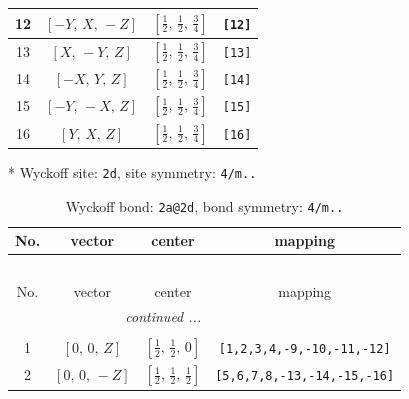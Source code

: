 \documentclass[fleqn,8pt]{jsarticle}
\begin{document}
\begin{longtable}{cccc}
12 & $\left[ - Y,\, X,\, - Z \right]$ & $\left[ \frac{1}{2},\, \frac{1}{2},\, \frac{3}{4} \right]$ & {\tt [12]} \\ \hline
13 & $\left[ X,\, - Y,\, Z \right]$ & $\left[ \frac{1}{2},\, \frac{1}{2},\, \frac{3}{4} \right]$ & {\tt [13]} \\ \hline
14 & $\left[ - X,\, Y,\, Z \right]$ & $\left[ \frac{1}{2},\, \frac{1}{2},\, \frac{3}{4} \right]$ & {\tt [14]} \\ \hline
15 & $\left[ - Y,\, - X,\, Z \right]$ & $\left[ \frac{1}{2},\, \frac{1}{2},\, \frac{3}{4} \right]$ & {\tt [15]} \\ \hline
16 & $\left[ Y,\, X,\, Z \right]$ & $\left[ \frac{1}{2},\, \frac{1}{2},\, \frac{3}{4} \right]$ & {\tt [16]} \\
\end{longtable}
* Wyckoff site: {\tt 2d}, site symmetry: {\tt 4/m..}
\renewcommand{\arraystretch}{1.2}
\begin{longtable}{cccc}
\caption{Wyckoff bond: {\tt 2a@2d}, bond symmetry: {\tt 4/m..}}
 \\
 \hline \hline
No. & vector & center & mapping \\ \hline \endfirsthead

\multicolumn{3}{l}{\tablename\ \thetable{}} \\
 \hline \hline
No. & vector & center & mapping \\ \hline \endhead

 \hline \hline
\multicolumn{3}{r}{\footnotesize\it continued ...} \\ \endfoot

 \hline \hline
\multicolumn{3}{r}{} \\ \endlastfoot

1 & $\left[ 0,\, 0,\, Z \right]$ & $\left[ \frac{1}{2},\, \frac{1}{2},\, 0 \right]$ & {\tt [1,2,3,4,-9,-10,-11,-12]} \\ \hline
2 & $\left[ 0,\, 0,\, - Z \right]$ & $\left[ \frac{1}{2},\, \frac{1}{2},\, \frac{1}{2} \right]$ & {\tt [5,6,7,8,-13,-14,-15,-16]} \\
\end{longtable}
\renewcommand{\arraystretch}{1.2}
\end{document}
